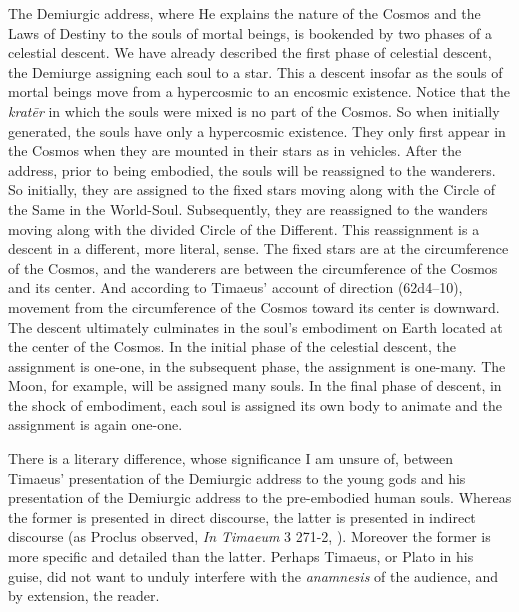 The Demiurgic address, where He explains the nature of the Cosmos and the Laws of Destiny to the souls of mortal beings, is bookended by two phases of a celestial descent. We have already described the first phase of celestial descent, the Demiurge assigning each soul to a star. This a descent insofar as the souls of mortal beings move from a hypercosmic to an encosmic existence. Notice that the \emph{kratēr} in which the souls were mixed is no part of the Cosmos. So when initially generated, the souls have only a hypercosmic existence. They only first appear in the Cosmos when they are mounted in their stars as in vehicles. After the address, prior to being embodied, the souls will be reassigned to the wanderers. So initially, they are assigned to the fixed stars moving along with the Circle of the Same in the World-Soul. Subsequently, they are reassigned to the wanders moving along with the divided Circle of the Different. This reassignment is a descent in a different, more literal, sense. The fixed stars are at the circumference of the Cosmos, and the wanderers are between the circumference of the Cosmos and its center. And according to Timaeus' account of direction (62d4–10), movement from the circumference of the Cosmos toward its center is downward. The descent ultimately culminates in the soul's embodiment on Earth located at the center of the Cosmos. In the initial phase of the celestial descent, the assignment is one-one, in the subsequent phase, the assignment is one-many. The Moon, for example, will be assigned many souls. In the final phase of descent, in the shock of embodiment, each soul is assigned its own body to animate and the assignment is again one-one.

There is a literary difference, whose significance I am unsure of, between Timaeus' presentation of the Demiurgic address to the young gods and his presentation of the Demiurgic address to the pre-embodied human souls. Whereas the former is presented in direct discourse, the latter is presented in indirect discourse (as Proclus observed, \emph{In Timaeum} 3 271-2, \citealt{Diehl:1903re}). Moreover the former is more specific and detailed than the latter. Perhaps Timaeus, or Plato in his guise, did not want to unduly interfere with the \emph{anamnesis} of the audience, and by extension, the reader.

